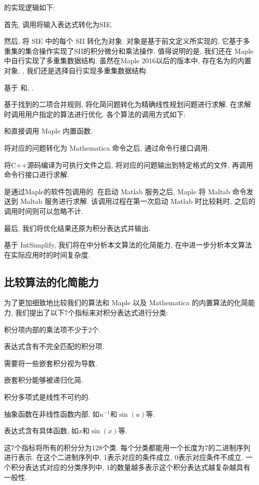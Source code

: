 的实现逻辑如下:
\begin{compactenum}[Step 1.]
\item 首先, 调用将输入表达式转化为SIE.
\item 然后, 将 SIE 中的每个 SII 转化为对象. 对象是基于前文定义所实现的, 它基于多重集的集合操作实现了SII的积分\D 微分和乘法操作. 值得说明的是, 我们还在 Maple 中自行实现了多重集数据结构. 虽然在Maple 2016以后的版本中, 存在名为的内置对象, , 我们还是选择自行实现多重集数据结构.
\item 基于\D {}\D {} 和, .
\item 基于找到的二项合并规则, 将化简问题转化为精确线性规划问题进行求解. 在求解时调用用户指定的算法进行优化. 各个算法的调用方式如下:
\begin{compactitem}[\textbullet]
\item {}和直接调用 Maple 内置函数.
\item {}将对应的问题转化为 Mathematica 命令之后, 通过命令行接口调用.
\item {}将C++源码编译为可执行文件之后, 将对应的问题输出到特定格式的文件, 再调用命令行接口进行求解.
\item {}是通过Maple的软件包调用的. 在启动 Matlab 服务之后, Maple 将 Maltab 命令发送到 Maltab 服务进行求解. 该调用过程在第一次启动 Matlab 时比较耗时, 之后的调用时间则可以忽略不计.
\end{compactitem}
\item 最后, 我们将优化结果还原为积分表达式并输出.
\end{compactenum}

基于 IntSimplify, 我们将在中分析本文算法的化简能力, 在中进一步分析本文算法在实际应用时的时间复杂度. 

\subsection{比较算法的化简能力}\label{sec5.1-03}
为了更加细致地比较我们的算法和 Maple 以及 Mathematica 的内置算法的化简能力, 我们提出了以下7个指标来对积分表达式进行分类:
\begin{compactenum}[(1) ]
\item 积分项内部的乘法项不少于2个.
\item 表达式含有不完全匹配的积分项.
\item 需要将一些嵌套积分视为导数. 
\item 嵌套积分能够被递归化简.
\item 积分多项式是线性不可约的.
\item 抽象函数在非线性函数内部, 如$u^{-1}$和$\sin(u)$等.  
\item 表达式含有具体函数, 如$x$和$\sin(x)$等. 
\end{compactenum} 
这7个指标将所有的积分分为128个类. 每个分类都能用一个长度为7的二进制序列进行表示. 在这个二进制序列中, 1表示对应的条件成立, 0表示对应条件不成立. 一个积分表达式对应的分类序列中, 1的数量越多表示这个积分表达式越复杂\D 越具有一般性. 

